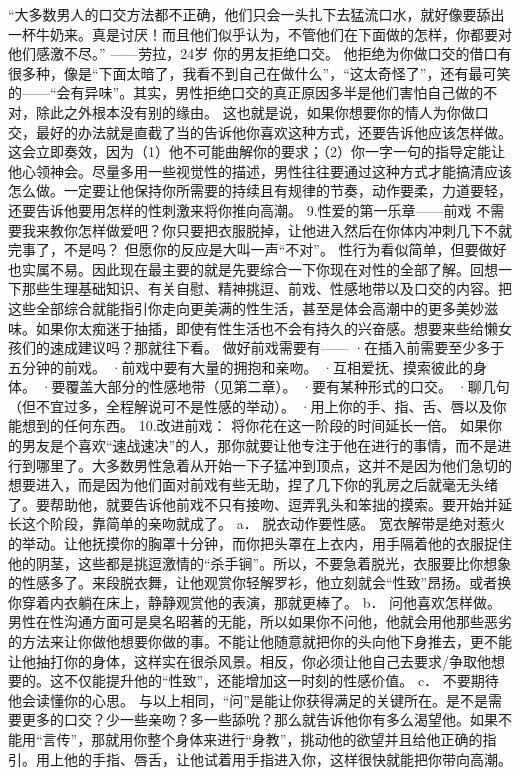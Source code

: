 \documentclass[12pt,UTF8]{ctexbook}
\begin{document}
“大多数男人的口交方法都不正确，他们只会一头扎下去猛流口水，就好像要舔出一杯牛奶来。真是讨厌！而且他们似乎认为，不管他们在下面做的怎样，你都要对他们感激不尽。”
——劳拉，24岁
你的男友拒绝口交。
他拒绝为你做口交的借口有很多种，像是“下面太暗了，我看不到自己在做什么”，“这太奇怪了”，还有最可笑的——“会有异味”。其实，男性拒绝口交的真正原因多半是他们害怕自己做的不对，除此之外根本没有别的缘由。
这也就是说，如果你想要你的情人为你做口交，最好的办法就是直截了当的告诉他你喜欢这种方式，还要告诉他应该怎样做。
这会立即奏效，因为（1）他不可能曲解你的要求；（2）你一字一句的指导定能让他心领神会。尽量多用一些视觉性的描述，男性往往要通过这种方式才能搞清应该怎么做。一定要让他保持你所需要的持续且有规律的节奏，动作要柔，力道要轻，还要告诉他要用怎样的性刺激来将你推向高潮。
9.性爱的第一乐章——前戏
不需要我来教你怎样做爱吧？你只要把衣服脱掉，让他进入然后在你体内冲刺几下不就完事了，不是吗？
但愿你的反应是大叫一声“不对”。
性行为看似简单，但要做好也实属不易。因此现在最主要的就是先要综合一下你现在对性的全部了解。回想一下那些生理基础知识、有关自慰、精神挑逗、前戏、性感地带以及口交的内容。把这些全部综合就能指引你走向更美满的性生活，甚至是体会高潮中的更多美妙滋味。如果你太痴迷于抽插，即使有性生活也不会有持久的兴奋感。想要来些给懒女孩们的速成建议吗？那就往下看。
做好前戏需要有——
·在插入前需要至少多于五分钟的前戏。
·前戏中要有大量的拥抱和亲吻。
·互相爱抚、摸索彼此的身体。
·要覆盖大部分的性感地带（见第二章）。
·要有某种形式的口交。
·聊几句（但不宜过多，全程解说可不是性感的举动）。
·用上你的手、指、舌、唇以及你能想到的任何东西。
10.改进前戏：
将你花在这一阶段的时间延长一倍。
如果你的男友是个喜欢“速战速决”的人，那你就要让他专注于他在进行的事情，而不是进行到哪里了。大多数男性急着从开始一下子猛冲到顶点，这并不是因为他们急切的想要进入，而是因为他们面对前戏有些无助，捏了几下你的乳房之后就毫无头绪了。要帮助他，就要告诉他前戏不只有接吻、逗弄乳头和笨拙的摸索。要开始并延长这个阶段，靠简单的亲吻就成了。
a． 脱衣动作要性感。
宽衣解带是绝对惹火的举动。让他抚摸你的胸罩十分钟，而你把头罩在上衣内，用手隔着他的衣服捉住他的阴茎，这些都是挑逗激情的“杀手锏”。所以，不要急着脱光，衣服要比你想象的性感多了。来段脱衣舞，让他观赏你轻解罗衫，他立刻就会“性致”昂扬。或者换你穿着内衣躺在床上，静静观赏他的表演，那就更棒了。
b． 问他喜欢怎样做。
男性在性沟通方面可是臭名昭著的无能，所以如果你不问他，他就会用他那些恶劣的方法来让你做他想要你做的事。不能让他随意就把你的头向他下身推去，更不能让他抽打你的身体，这样实在很杀风景。相反，你必须让他自己去要求/争取他想要的。这不仅能提升他的“性致”，还能增加这一时刻的性感价值。
c． 不要期待他会读懂你的心思。
与以上相同，“问”是能让你获得满足的关键所在。是不是需要更多的口交？少一些亲吻？多一些舔吮？那么就告诉他你有多么渴望他。如果不能用“言传”，那就用你整个身体来进行“身教”，挑动他的欲望并且给他正确的指引。用上他的手指、唇舌，让他试着用手指进入你，这样很快就能把你带向高潮。
\end{document}
